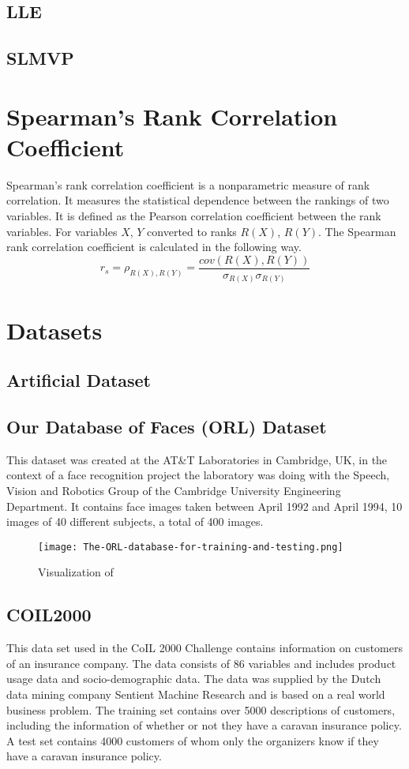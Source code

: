 \subsection{LLE}
\subsection{SLMVP}

\section{Spearman's Rank Correlation Coefficient}
Spearman's rank correlation coefficient is a nonparametric measure of rank correlation. It measures the statistical dependence between the rankings of two variables. It is defined as the Pearson correlation coefficient between the rank variables. For variables $X$, $Y$ converted to ranks $R(X)$, $R(Y)$. The Spearman rank correlation coefficient is calculated in the following way.
\begin{equation}
    r_s = \rho_{R(X), R(Y)} = \frac{cov(R(X),R(Y))}{\sigma_{R(X)} \sigma_{R(Y)}}
\end{equation}

\section{Datasets}
\subsection{Artificial Dataset}
\subsection{Our Database of Faces (ORL) Dataset}
This dataset was created at the AT\&T Laboratories in Cambridge, UK, in the context of a face recognition project the laboratory was doing with the Speech, Vision and Robotics Group of the Cambridge University Engineering Department. It contains face images taken between April 1992 and April 1994, 10 images of 40 different subjects, a total of 400 images.

\begin{figure}
    \centering
    \texttt{[image: The-ORL-database-for-training-and-testing.png]}
    \caption{Visualization of }
    \label{fig:orl_faces}
\end{figure}

\subsection{COIL2000}
This data set used in the CoIL 2000 Challenge contains information on customers of an insurance company. The data consists of 86 variables and includes product usage data and socio-demographic data. The data was supplied by the Dutch data mining company Sentient Machine Research and is based on a real world business problem. The training set contains over 5000 descriptions of customers, including the information of whether or not they have a caravan insurance policy. A test set contains 4000 customers of whom only the organizers know if they have a caravan insurance policy.
\cite{van2004bias}


